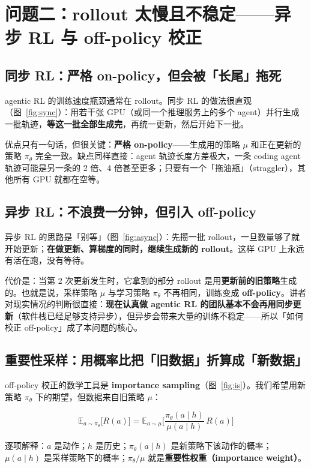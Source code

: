 \documentclass[a4paper]{article}
\begin{document}
\section{问题二：rollout 太慢且不稳定——异步 RL 与 off-policy 校正}

\subsection{同步 RL：严格 on-policy，但会被「长尾」拖死}

agentic RL 的训练速度瓶颈通常在 rollout。同步 RL 的做法很直观（图~\ref{fig:sync}）：用若干张 GPU（或同一个推理服务上的多个 agent）并行生成一批轨迹，\textbf{等这一批全部生成完}，再统一更新，然后开始下一批。

优点只有一句话，但很关键：\textbf{严格 on-policy}——生成用的策略 $\mu$ 和正在更新的策略 $\pi_\theta$ 完全一致。缺点同样直接：agent 轨迹长度方差极大，一条 coding agent 轨迹可能是另一条的 2 倍、4 倍甚至更多；只要有一个「拖油瓶」（straggler），其他所有 GPU 就都在空等。

\subsection{异步 RL：不浪费一分钟，但引入 off-policy}

异步 RL 的思路是「别等」（图~\ref{fig:async}）：先攒一批 rollout，一旦数量够了就开始更新；\textbf{在做更新、算梯度的同时，继续生成新的 rollout}。这样 GPU 上永远有活在跑，没有等待。

代价是：当第 2 次更新发生时，它拿到的部分 rollout 是用\textbf{更新前的旧策略}生成的。也就是说，采样策略 $\mu$ 与学习策略 $\pi_\theta$ 不再相同，训练变成 \textbf{off-policy}。讲者对现实情况的判断很直接：\textbf{现在认真做 agentic RL 的团队基本不会再用同步更新}（软件栈已经足够支持异步），但异步会带来大量的训练不稳定——所以「如何校正 off-policy」成了本问题的核心。

\subsection{重要性采样：用概率比把「旧数据」折算成「新数据」}

off-policy 校正的数学工具是 \textbf{importance sampling}（图~\ref{fig:is}）。我们希望用新策略 $\pi_\theta$ 下的期望，但数据来自旧策略 $\mu$：

$$\mathbb{E}_{a \sim \pi_\theta}\big[R(a)\big] = \mathbb{E}_{a \sim \mu}\Big[\frac{\pi_\theta(a \mid h)}{\mu(a \mid h)}\,R(a)\Big]$$

逐项解释：$a$ 是动作；$h$ 是历史；$\pi_\theta(a\mid h)$ 是新策略下该动作的概率；$\mu(a\mid h)$ 是采样策略下的概率；$\pi_\theta/\mu$ 就是\textbf{重要性权重（importance weight）}。
\end{document}
